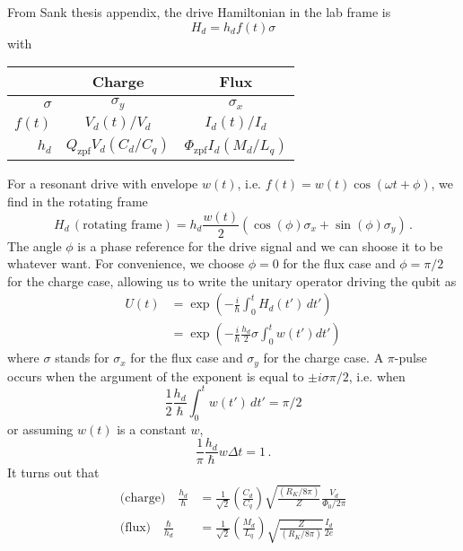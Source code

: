From Sank thesis appendix, the drive Hamiltonian in the lab frame is
\begin{equation*}
  H_d = h_d f(t) \sigma
\end{equation*}
with
\begin{center}
  \begin{tabular}{r | c | c}
    & \textbf{Charge} & \textbf{Flux} \\
    \hline
    $\sigma$ & $\sigma_y$ & $\sigma_x$ \\
    \hline
    $f(t)$ & $V_d(t)/V_d$ & $I_d(t) / I_d$ \\
    \hline
    $h_d$ & $Q_\text{zpf} V_d(C_d/C_q)$ & $\Phi_\text{zpf} I_d (M_d/L_q)$
  \end{tabular}
\end{center}
For a resonant drive with envelope $w(t)$, i.e. $f(t) = w(t) \cos(\omega t + \phi)$, we find in the rotating frame
\begin{equation*}
  H_d \, (\text{rotating frame}) = h_d \frac{w(t)}{2} \left( \cos(\phi) \sigma_x + \sin(\phi) \sigma_y \right) \, .
\end{equation*}
The angle $\phi$ is a phase reference for the drive signal and we can shoose it to be whatever want.
For convenience, we choose $\phi=0$ for the flux case and $\phi=\pi/2$ for the charge case, allowing us to write the unitary operator driving the qubit as
\begin{align*}
  U(t)
  &= \exp \left( -\frac{i}{\hbar} \int_0^t H_d(t') \, dt' \right) \\
  &= \exp \left( -\frac{i}{\hbar} \frac{h_d}{2} \sigma \int_0^t w(t') dt' \right)
\end{align*}
where $\sigma$ stands for $\sigma_x$ for the flux case and $\sigma_y$ for the charge case.
A $\pi$-pulse occurs when the argument of the exponent is equal to $\pm i \sigma \pi / 2$, i.e. when
\begin{equation*}
  \frac{1}{2} \frac{h_d}{\hbar} \int_0^t w(t') \, dt' = \pi / 2
\end{equation*}
or assuming $w(t)$ is a constant $w$,
\begin{equation}
  \frac{1}{\pi} \frac{h_d}{\hbar} w \Delta t = 1 \, .
\end{equation}
It turns out that
\begin{align*}
  \text{(charge)} \quad \frac{h_d}{\hbar} &=
  \frac{1}{\sqrt{2}} \left(\frac{C_d}{C_q} \right) \sqrt{\frac{(R_K / 8\pi)}{Z}} \frac{V_d}{\Phi_0/2\pi} \\
  \text{(flux)} \quad \frac{\hbar}{h_d} &=
  \frac{1}{\sqrt{2}} \left( \frac{M_d}{L_q} \right) \sqrt{\frac{Z}{(R_K/8\pi)}} \frac{I_d}{2e}
\end{align*}

